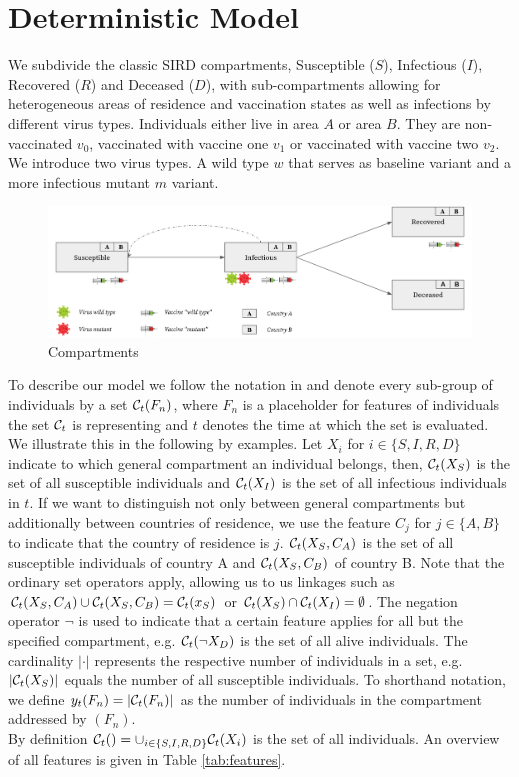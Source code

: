 \section{Deterministic Model}
\label{sec:model}
We subdivide the classic SIRD compartments, Susceptible ($S$), Infectious ($I$), Recovered ($R$) and Deceased ($D$), with sub-compartments allowing for heterogeneous areas of residence and vaccination states as well as infections by different virus types. Individuals either live in area $A$ or area $B$. They are non-vaccinated $v_0$, vaccinated with vaccine one $v_1$ or vaccinated with vaccine two $v_2$. We introduce two virus types. A wild type $w$ that serves as baseline variant and a more infectious mutant $m$ variant.
\begin{figure}[h!]
\centering
\includegraphics[scale=0.23]{images/vaccination_pp.png}
\caption{Compartments }
\end{figure}
To describe our model we follow the notation in \cite{Waites.2021} and denote every sub-group of individuals by a set $\mathcal{C}_t(F_n)$, where $F_n$ is a placeholder for features of individuals the set $\mathcal{C}_t$ is representing and $t$ denotes the time at which the set is evaluated. We illustrate this in the following by examples. Let $X_i$ for $i \in \{S, I, R, D \}$ indicate to which general compartment an individual belongs, then, $\mathcal{C}_t(X_S)$ is the set of all susceptible individuals and $\mathcal{C}_t(X_I)$ is the set of all infectious individuals in $t$. If we want to distinguish not only between general compartments but additionally between countries of residence, we use the feature $C_j$ for $j \in \{A, B\}$ to indicate that the country of residence is $j$. $\mathcal{C}_t(X_S, C_A)$ is the set of all susceptible individuals of country A and $\mathcal{C}_t(X_S, C_B)$ of country B. Note that the ordinary set operators apply, allowing us to us linkages such as $\mathcal{C}_t(X_S, C_A) \cup \mathcal{C}_t(X_S, C_B) = \mathcal{C}_t(x_S)$ or $\mathcal{C}_t(X_S) \cap \mathcal{C}_t(X_I) = \emptyset$. The negation operator $\neg$ is used to indicate that a certain feature applies for all but the specified compartment, e.g. $\mathcal{C}_t(\neg X_D)$ is the set of all alive individuals. The cardinality $|\cdot|$ represents the respective number of individuals in a set, e.g. $|\mathcal{C}_t(X_S)|$ equals the number of all susceptible individuals. To shorthand notation, we define $y_t(F_n) = |\mathcal{C}_t(F_n)|$ as the number of individuals in the compartment addressed by $(F_n)$. \\ By definition $\mathcal{C}_t() = \cup_{i \in \{ S, I, R,D\}} \mathcal{C}_t(X_i)$ is the set of all individuals. An overview of all features is given in Table \ref{tab:features}. 


